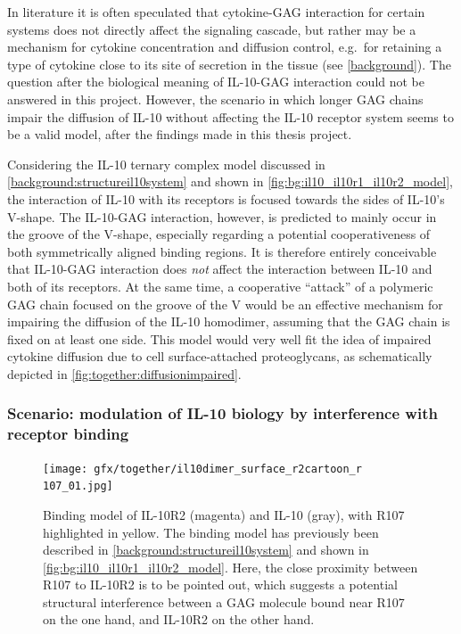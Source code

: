 In literature it is often speculated that cytokine-GAG interaction for certain
systems does not directly affect the signaling cascade, but rather may be a
mechanism for cytokine concentration and diffusion control, e.g.\ for retaining
a type of cytokine close to its site of secretion in the tissue (see
\cref{background}). The question after the biological meaning of IL-10-GAG
interaction could not be answered in this project. However, the scenario in
which longer GAG chains impair the diffusion of IL-10 without affecting the
IL-10 receptor system seems to be a valid model, after the findings made in this
thesis project.

Considering the IL-10 ternary complex model discussed in
\cref{background:structureil10system} and shown in
\cref{fig:bg:il10_il10r1_il10r2_model}, the interaction of IL-10 with its
receptors is focused towards the sides of IL-10's V-shape. The IL-10-GAG
interaction, however, is predicted to mainly occur in the groove of the V-shape,
especially regarding a potential cooperativeness of both symmetrically aligned
binding regions. It is therefore entirely conceivable that IL-10-GAG interaction
does \textit{not} affect the interaction between IL-10 and both of its
receptors. At the same time, a cooperative \enquote{attack} of a polymeric GAG
chain focused on the groove of the V would be an effective mechanism for
impairing the diffusion of the IL-10 homodimer, assuming that the GAG chain is
fixed on at least one side. This model would very well fit the idea of impaired
cytokine diffusion due to cell surface-attached proteoglycans, as schematically
depicted in \cref{fig:together:diffusionimpaired}.


\subsubsection{Scenario: modulation of IL-10 biology by interference with receptor
binding}

\begin{figure}
\centering
\texttt{[image: gfx/together/il10dimer\_surface\_r2cartoon\_r
107\_01.jpg]}
\caption[]{
Binding model of IL-10R2 (magenta) and IL-10 (gray), with R107 highlighted in
yellow. The binding model has previously been described in
\cref{background:structureil10system} and shown in
\cref{fig:bg:il10_il10r1_il10r2_model}. Here, the close proximity between R107
to IL-10R2 is to be pointed out, which suggests a potential structural
interference between a GAG molecule bound near R107 on the one hand, and IL-10R2
on the other hand.}
\label{fig:together:r2impaired}
\end{figure}

